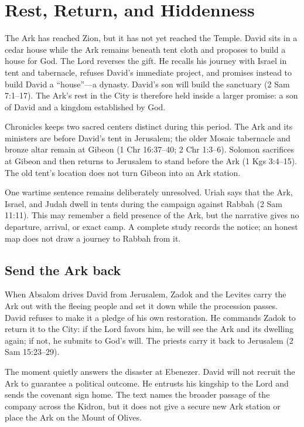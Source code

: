 \section{Rest, Return, and Hiddenness}

The Ark has reached Zion, but it has not yet reached the Temple.  David sits in
a cedar house while the Ark remains beneath tent cloth and proposes to build a
house for God.  The Lord reverses the gift.  He recalls his journey with Israel
in tent and tabernacle, refuses David's immediate project, and promises instead
to build David a ``house''---a dynasty.  David's son will build the sanctuary
(2 Sam 7:1--17).  The Ark's rest in the City is therefore held inside a larger
promise: a son of David and a kingdom established by God.

Chronicles keeps two sacred centers distinct during this period.  The Ark and
its ministers are before David's tent in Jerusalem; the older Mosaic
tabernacle and bronze altar remain at Gibeon (1 Chr 16:37--40;
2 Chr 1:3--6).  Solomon sacrifices at Gibeon and then returns to Jerusalem to
stand before the Ark (1 Kgs 3:4--15).  The old tent's location does not turn
Gibeon into an Ark station.

One wartime sentence remains deliberately unresolved.  Uriah says that the
Ark, Israel, and Judah dwell in tents during the campaign against Rabbah
(2 Sam 11:11).  This may remember a field presence of the Ark, but the
narrative gives no departure, arrival, or exact camp.  A complete study records
the notice; an honest map does not draw a journey to Rabbah from it.

\subsection{Send the Ark back}

When Absalom drives David from Jerusalem, Zadok and the Levites carry the Ark
out with the fleeing people and set it down while the procession passes.
David refuses to make it a pledge of his own restoration.  He commands Zadok
to return it to the City: if the Lord favors him, he will see the Ark and its
dwelling again; if not, he submits to God's will.  The priests carry it back to
Jerusalem (2 Sam 15:23--29).

The moment quietly answers the disaster at Ebenezer.  David will not recruit
the Ark to guarantee a political outcome.  He entrusts his kingship to the
Lord and sends the covenant sign home.  The text names the broader passage of
the company across the Kidron, but it does not give a secure new Ark station or
place the Ark on the Mount of Olives.

